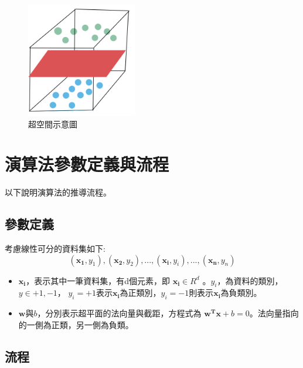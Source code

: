 \begin{figure}[H]
	\centerline{\includegraphics[height=5cm]{pic/over space.PNG}}
	\caption{超空間示意圖}
	\label{fig:Hyperspace}
\end{figure}

\section{演算法參數定義與流程}
以下說明演算法的推導流程。

\subsection{參數定義}
考慮線性可分的資料集如下:
$$(\mathbf{x_1},y_1),(\mathbf{x_2},y_2),...,(\mathbf{x_i},y_i),...,(\mathbf{x_n},y_n)$$

\begin{itemize}

	\item
	      \(\mathbf{x_i}\)，表示其中一筆資料集，有d個元素，即 \(\mathbf{x_i}\in R^d\) 。\(y_i\)，為資料的類別， \(y \in +1,-1\)， \(y_i =+1\)表示\(\mathbf{x_i}\)為正類別，\(y_i =-1\)則表示\(\mathbf{x_i}\)為負類別。

	\item
	      \(\mathbf{w}\)與\(b\)，分別表示超平面的法向量與截距，方程式為 \(\mathbf{w^Tx}+b=0\)。法向量指向的一側為正類，另一側為負類。
\end{itemize}

\subsection{流程}

